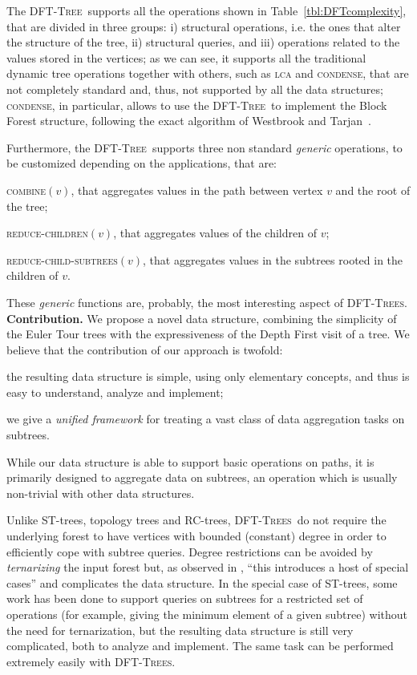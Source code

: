 \documentclass[a4paper,USenglish]{lipics}
\newcommand{\dft}{\textsc{DFT-Tree}}
\newcommand{\dfts}{\textsc{DFT-Trees}}
\newcommand{\runinsec}[1]{\noindent\textbf{\textsf{#1}}\quad}
\begin{document}
The \dft\ supports all the operations shown in Table~\ref{tbl:DFTcomplexity}, that are divided in three groups: i) structural operations, i.e. the ones that alter the structure of the tree, ii) structural queries, and iii) operations related to the values stored in the vertices; as we can see, it supports all the traditional dynamic tree operations together with others, such as \textsc{lca} and \textsc{condense}, that are not completely standard and, thus, not supported by all the data structures;  \textsc{condense}, in particular, allows to use the \dft\ to implement the Block Forest structure, following the exact algorithm of Westbrook and Tarjan~\cite{WT92}. 

Furthermore, the \dft\ supports three non standard \emph{generic} operations, to be customized depending on the applications, that are:
\begin{compactitem}
\item \textsc{combine}$(v)$, that aggregates values in the path between vertex $v$ and the root of the tree;
\item \textsc{reduce-children}$(v)$, that aggregates values of the children of $v$;
\item \textsc{reduce-child-subtrees}$(v)$, that aggregates values in the subtrees rooted in the children of $v$. 
\end{compactitem}
These \emph{generic} functions are, probably, the most interesting aspect of \dfts.
\\[3mm]
\runinsec{Contribution.}
We propose a novel data structure, combining the simplicity of the Euler Tour trees with the expressiveness of the Depth First visit of a tree. We believe that the contribution of our approach is twofold:
\begin{compactitem}
	\item the resulting data structure is simple, using only elementary concepts, and thus is easy to understand, analyze and implement;
	\item we give a \emph{unified framework} for treating a vast class of data aggregation tasks on subtrees.
\end{compactitem}
While our data structure is able to support basic operations on paths, it is primarily designed to aggregate data on subtrees, an operation which is usually non-trivial with other data structures.

Unlike ST-trees, topology trees and RC-trees, \dfts\ do not require the underlying forest to have vertices with bounded (constant) degree in order to efficiently cope with subtree queries. Degree restrictions can be avoided by \emph{ternarizing} the input forest but, as observed in \cite{Wer08}, ``this introduces a host of special cases'' and complicates the data structure. In the special case of ST-trees, some work has been done \cite{Radzik98implementationof} to support queries on subtrees {for a restricted set of operations} (for example, giving the minimum element of a given subtree) without the need for ternarization, but the resulting data structure is still very complicated, both to analyze and implement. The same task can be performed extremely easily with \dfts.
\end{document}
